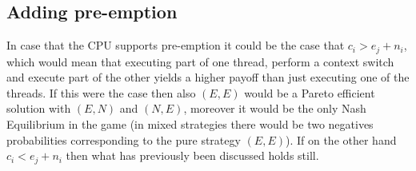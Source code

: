 \subsection{Adding pre-emption}

In case that the CPU supports pre-emption it could be the case that
$c_i > e_j + n_i$, which would mean that executing part of one thread, perform
a context switch and execute part of the other yields a higher payoff than
just executing one of the threads. If this were the case then also $(E, E)$
would be a Pareto efficient solution with $(E, N)$ and $(N, E)$, moreover it
would be the only Nash Equilibrium in the game (in mixed strategies there
would be two negatives probabilities corresponding to the pure strategy $(E,E)$).
If on the other hand $c_i < e_j + n_i$ then what has previously been discussed
holds still.